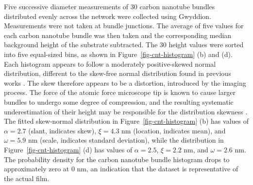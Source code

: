 \documentclass[
  a4paper,
]{scrbook}
\begin{document}
Five successive diameter measurements of 30 carbon nanotube bundles
distributed evenly across the network were collected using Gwyddion.
Measurements were not taken at bundle junctions. The average of five
values for each carbon nanotube bundle was then taken and the
corresponding median background height of the substrate subtracted. The
30 height values were sorted into five equal-sized bins, as shown in
Figure~\ref{fig-cnt-histogram} (b) and (d). Each histogram appears to
follow a moderately positive-skewed normal distribution, different to
the skew-free normal distribution found in previous works
\autocite{LeMieux2008,Liu2013,Vobornik2023}. The skew therefore appears
to be a distortion, introduced by the imaging process. The force of the
atomic force microscope tip is known to cause larger bundles to undergo
some degree of compression, and the resulting systematic underestimation
of their height may be responsible for the distribution skewness
\autocite{Vobornik2023}. The fitted skew-normal distribution in
Figure~\ref{fig-cnt-histogram} (b) has values of \(\alpha = 2.7\)
(slant, indicates skew), \(\xi = 4.3\) nm (location, indicates mean),
and \(\omega = 5.9\) nm (scale, indicates standard deviation), while the
distribution in Figure~\ref{fig-cnt-histogram} (d) has values of
\(\alpha = 2.5\), \(\xi = 2.2\) nm, and \(\omega = 2.6\) nm. The
probability density for the carbon nanotube bundle histogram drops to
approximately zero at 0 nm, an indication that the dataset is
representative of the actual film.
\end{document}
